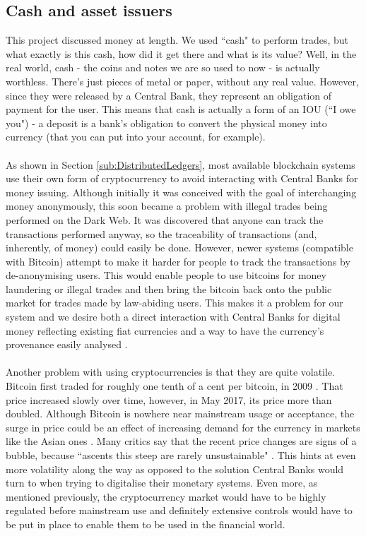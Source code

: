 \documentclass[12pt,twoside]{article}
\begin{document}
\subsection{Cash and asset issuers}
\label{sub:cashissuers}
This project discussed money at length. We used ``cash" to perform trades, but what exactly is this cash, how did it get there and what is its value? Well, in the real world, cash - the coins and notes we are so used to now - is actually worthless. There's just pieces of metal or paper, without any real value. However, since they were released by a Central Bank, they represent an obligation of payment for the user. This means that cash is actually a form of an IOU (``I owe you") - a deposit is a bank's obligation to convert the physical money into currency (that you can put into your account, for example).
\\ \\
As shown in Section \ref{sub:DistributedLedgers}, most available blockchain systems use their own form of cryptocurrency to avoid interacting with Central Banks for money issuing. Although initially it was conceived with the goal of interchanging money anonymously, this soon became a problem with illegal trades being performed on the Dark Web. It was discovered that anyone can track the transactions performed anyway, so the traceability of transactions (and, inherently, of money) could easily be done. However, newer systems (compatible with Bitcoin) attempt to make it harder for people to track the transactions by de-anonymising users. This would enable people to use bitcoins for money laundering or illegal trades and then bring the bitcoin back onto the public market for trades made by law-abiding users. This makes it a problem for our system and we desire both a direct interaction with Central Banks for digital money reflecting existing fiat currencies and a way to have the currency's provenance easily analysed \cite{tumblebit}.
\\ \\
Another problem with using cryptocurrencies is that they are quite volatile. Bitcoin first traded for roughly one tenth of a cent per bitcoin, in 2009 \cite{first}. That price increased slowly over time, however, in May 2017, its price more than doubled. Although Bitcoin is nowhere near mainstream usage or acceptance, the surge in price could be an effect of increasing demand for the currency in markets like the Asian ones \cite{voxbubble}. Many critics say that the recent price changes are signs of a bubble, because ``ascents this steep are rarely unsustainable" \cite{bubble}. This hints at even more volatility along the way as opposed to the solution Central Banks would turn to when trying to digitalise their monetary systems. Even more, as mentioned previously, the cryptocurrency market would have to be highly regulated before mainstream use and definitely extensive controls would have to be put in place to enable them to be used in the financial world.
\end{document}
